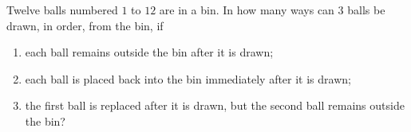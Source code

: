 Twelve balls numbered $1$ to $12$ are in a bin. In how many ways can $3$ balls be drawn, in order, from the bin, if
\begin{enumerate}
\item[(a)] each ball remains outside the bin after it is drawn;
\item[(b)] each ball is placed back into the bin immediately after it is drawn;
\item[(c)] the first ball is replaced after it is drawn, but the second ball remains outside the bin?
\end{enumerate}
